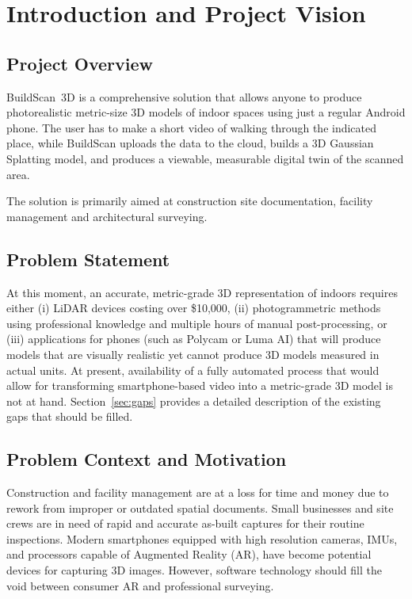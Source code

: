 \chapter{Introduction and Project Vision}

\section{Project Overview}
BuildScan~3D is a comprehensive solution that allows anyone to produce photorealistic metric-size 3D models of indoor spaces using just a regular Android phone. The user has to make a short video of walking through the indicated place, while BuildScan uploads the data to the cloud, builds a 3D Gaussian Splatting model, and produces a viewable, measurable digital twin of the scanned area.

The solution is primarily aimed at construction site documentation, facility management and architectural surveying.

\section{Problem Statement}
At this moment, an accurate, metric-grade 3D representation of indoors requires either (i) LiDAR devices costing over \$10,000, (ii) photogrammetric methods using professional knowledge and multiple hours of manual post-processing, or (iii) applications for phones (such as Polycam or Luma AI) that will produce models that are visually realistic yet cannot produce 3D models measured in actual units. At present, availability of a fully automated process that would allow for transforming smartphone-based video into a metric-grade 3D model is not at hand. Section~\ref{sec:gaps} provides a detailed description of the existing gaps that should be filled.

\section{Problem Context and Motivation}
Construction and facility management are at a loss for time and money due to rework from improper or outdated spatial documents. Small businesses and site crews are in need of rapid and accurate as-built captures for their routine inspections. Modern smartphones equipped with high resolution cameras, IMUs, and processors capable of Augmented Reality (AR), have become potential devices for capturing 3D images. However, software technology should fill the void between consumer AR and professional surveying.

